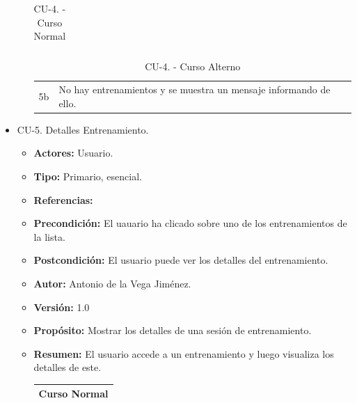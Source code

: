 \begin{itemize}
\begin{itemize}
\begin{table}[H]
\begin{tabularx}{\textwidth}{|l|X|l|X|}
      \end{tabularx}
      \caption{CU-4. - Curso Normal}
      \label{my-label}
    \end{table}
    \begin{table}[H]
      \centering
      \begin{tabularx}{\textwidth}{|l|X|}
       \hline
       \rowcolor[HTML]{C0C0C0} 
       \multicolumn{2}{|l|}{\cellcolor[HTML]{C0C0C0}Curso Alterno} \\ \hline
       \rowcolor[HTML]{FFFFFF} 
              5b                      & No hay entrenamientos y se muestra un mensaje informando de ello.                           \\ \hline
      \end{tabularx}
      \caption{CU-4. - Curso Alterno}
      \label{my-label}
    \end{table}
  \end{itemize}
  \item CU-5. Detalles Entrenamiento.
  \begin{itemize}
    \item \textbf{Actores:} Usuario.
    \item \textbf{Tipo:} Primario, esencial.
    \item \textbf{Referencias:}
    \item \textbf{Precondición:} El uauario ha clicado sobre uno de los entrenamientos de la lista.
    \item \textbf{Postcondición:} El usuario puede ver los detalles del entrenamiento.
    \item \textbf{Autor:} Antonio de la Vega Jiménez.
    \item \textbf{Versión:} 1.0
    \item \textbf{Propósito:} Mostrar los detalles de una sesión de entrenamiento.
    \item \textbf{Resumen:} El usuario accede a un entrenamiento y luego visualiza los detalles de este.
    \begin{table}[H]
      \centering
      \begin{tabularx}{\textwidth}{|l|X|l|X|}
        \hline
        \multicolumn{4}{|c|}{\cellcolor[HTML]{C0C0C0}Curso Normal}                                                 \\ \hline

\end{tabularx}
\end{table}
\end{itemize}
\end{itemize}
